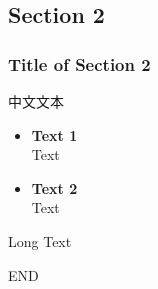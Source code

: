 \documentclass[unicode]{beamer}
\begin{document}
\begin{CJK}{UTF8}{gbsn}
  \section{Section 2}
  \begin{frame}
    \frametitle{Title of Section 2}
    \CJKindent
    中文文本\\
    \begin{itemize}
    \item \textbf{Text 1} \\
      \footnotesize
      Text\normalsize
    \item \textbf{Text 2} \\ \footnotesize
      Text \normalsize
    \end{itemize}
    \vfill{}\par\CJKindent
    Long Text
  \end{frame}

  \begin{frame}
    \begin{center}
      \Huge END \normalsize
    \end{center}
  \end{frame}

\end{CJK}
\end{document}
